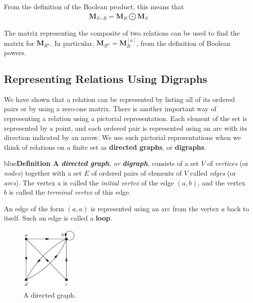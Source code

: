 \documentclass[11pt]{article}
\newenvironment{definition}[1]{\begin{mybox}{blue}{\textbf{Definition #1}}}{\end{mybox}}
\begin{document}
From the definition of the Boolean product, this means that
\begin{align*}
    \mathbf{M}_{S \circ R} = \mathbf{M}_R \bigodot \mathbf{M}_S & & &
\end{align*}

\noindent The matrix representing the composite of two relations can be used to find the matrix for $\textbf{M}_{R^n}$. In particular,
$\textbf{M}_{R^n} = \textbf{M}_R^{[n]}$,
from the definition of Boolean powers.

\subsection{Representing Relations Using Digraphs}

We have shown that a relation can be represented by listing all of its ordered pairs or by using a zero-one matrix. There is another important way of representing a relation using a pictorial representation. Each element of the set is represented by a point, and each ordered pair is represented using an arc with its direction indicated by an arrow. We use such pictorial representations when we think of relations on a finite set as \textbf{directed graphs}, or \textbf{digraphs}.

\begin{definition}{1}
A \textit{\textbf{directed graph}, or \textbf{digraph}}, consists of a set $V$ of \textit{vertices} (or \textit{nodes}) together with a set $E$ of ordered pairs of elements of $V$ called \textit{edges} (or \textit{arcs}). The vertex a is called the \textit{initial vertex} of the edge $(a, b)$, and the vertex $b$ is called the \textit{terminal vertex} of this edge.
\end{definition}

An edge of the form $(a, a)$ is represented using an arc from the vertex $a$ back to itself. Such an edge is called a \textbf{loop}.

\begin{figure}
    \centering
    \includegraphics[width=0.25\textwidth]{img/ch9-figure3.png}
    \caption{A directed graph.}
\end{figure}
\end{document}

